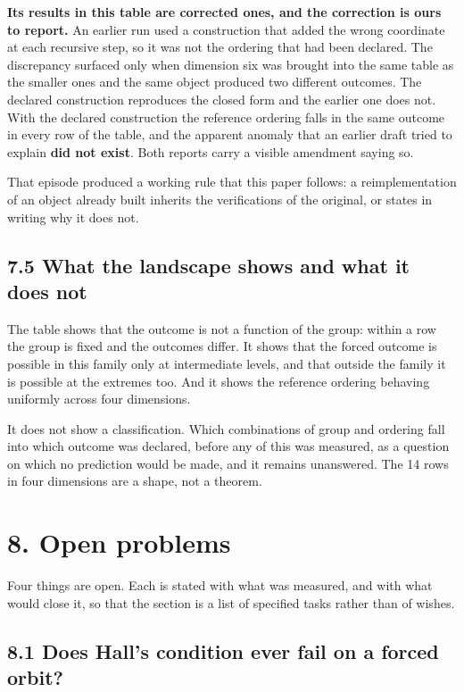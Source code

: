 \documentclass[11pt,a4paper]{article}
\begin{document}
\textbf{Its results in this table are corrected ones, and the correction is ours to report.} An earlier run used a construction that added the wrong coordinate at each recursive step, so it was not the ordering that had been declared. The discrepancy surfaced only when dimension six was brought into the same table as the smaller ones and the same object produced two different outcomes. The declared construction reproduces the closed form and the earlier one does not. With the declared construction the reference ordering falls in the same outcome in every row of the table, and the apparent anomaly that an earlier draft tried to explain \textbf{did not exist}. Both reports carry a visible amendment saying so.

That episode produced a working rule that this paper follows: a reimplementation of an object already built inherits the verifications of the original, or states in writing why it does not.

\subsection*{7.5 What the landscape shows and what it does not}

The table shows that the outcome is not a function of the group: within a row the group is fixed and the outcomes differ. It shows that the forced outcome is possible in this family only at intermediate levels, and that outside the family it is possible at the extremes too. And it shows the reference ordering behaving uniformly across four dimensions.

It does not show a classification. Which combinations of group and ordering fall into which outcome was declared, before any of this was measured, as a question on which no prediction would be made, and it remains unanswered. The 14 rows in four dimensions are a shape, not a theorem.

\section*{8. Open problems}

Four things are open. Each is stated with what was measured, and with what would close it, so that the section is a list of specified tasks rather than of wishes.

\subsection*{8.1 Does Hall's condition ever fail on a forced orbit?}
\end{document}
